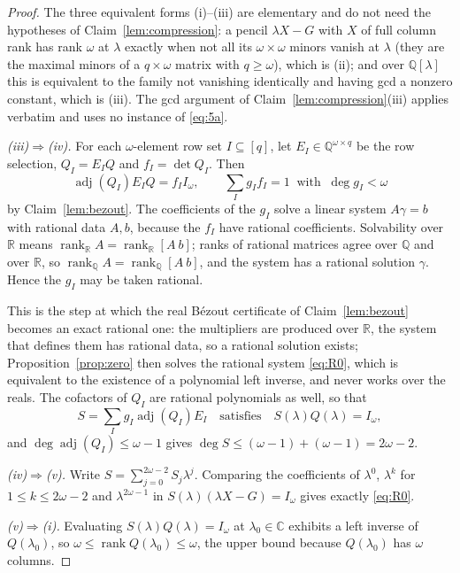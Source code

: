 \documentclass[journal]{IEEEtran}
\theoremstyle{plainn}
\theoremstyle{remark}
\begin{document}
\begin{proof}
The three equivalent forms (i)--(iii) are elementary and do not need the hypotheses of
Claim~\ref{lem:compression}: a pencil $\lambda X-G$ with $X$ of full column rank has rank $\omega$ at
$\lambda$ exactly when not all its $\omega\times\omega$ minors vanish at $\lambda$ (they are the maximal
minors of a $q\times\omega$ matrix with $q\ge\omega$), which is (ii); and over $\mathbb Q[\lambda]$ this
is equivalent to the family not vanishing identically and having gcd a nonzero constant, which is (iii).
The gcd argument of Claim~\ref{lem:compression}(iii) applies verbatim and uses no instance of
\eqref{eq:5a}.

\emph{(iii)$\Rightarrow$(iv).} For each $\omega$-element row set
$I\subseteq[q]$, let $E_I\in\mathbb Q^{\omega\times q}$ be the row selection,
$Q_I=E_IQ$ and $f_I=\det Q_I$. Then
\begin{equation*}
\operatorname{adj}(Q_I)E_IQ=f_II_\omega,\qquad
\sum_Ig_If_I=1\ \text{ with }\ \deg g_I<\omega
\end{equation*}
by Claim~\ref{lem:bezout}. The coefficients of the $g_I$ solve a linear system $A\gamma=b$ with rational data $A,b$, because the
$f_I$ have rational coefficients. Solvability over $\mathbb R$ means
$\operatorname{rank}_{\mathbb R}A=\operatorname{rank}_{\mathbb R}[A\ b]$; ranks of rational matrices
agree over $\mathbb Q$ and over $\mathbb R$, so
$\operatorname{rank}_{\mathbb Q}A=\operatorname{rank}_{\mathbb Q}[A\ b]$, and the system has a
rational solution $\gamma$. Hence the $g_I$ may be taken rational.

This is the step at which the real B\'ezout certificate of Claim~\ref{lem:bezout} becomes an exact
rational one: the multipliers are produced over $\mathbb R$, the system that defines them has rational
data, so a rational solution exists; Proposition~\ref{prop:zero} then solves the rational system
\eqref{eq:R0}, which is equivalent to the existence of a polynomial left inverse, and never works over
the reals. The cofactors of $Q_I$
are rational polynomials as well, so that
\begin{equation*}
S=\sum_Ig_I\operatorname{adj}(Q_I)E_I
\quad\text{satisfies}\quad
S(\lambda)Q(\lambda)=I_\omega ,
\end{equation*}
and $\deg\operatorname{adj}(Q_I)\le\omega-1$ gives
$\deg S\le(\omega-1)+(\omega-1)=2\omega-2$.

\emph{(iv)$\Rightarrow$(v).} Write $S=\sum_{j=0}^{2\omega-2}S_j\lambda^j$. Comparing the
coefficients of $\lambda^0$, $\lambda^k$ for $1\le k\le2\omega-2$ and $\lambda^{2\omega-1}$ in
$S(\lambda)(\lambda X-G)=I_\omega$ gives exactly \eqref{eq:R0}.

\emph{(v)$\Rightarrow$(i).} Evaluating $S(\lambda)Q(\lambda)=I_\omega$ at $\lambda_0\in\mathbb C$
exhibits a left inverse of $Q(\lambda_0)$, so $\omega\le\operatorname{rank}Q(\lambda_0)\le\omega$,
the upper bound because $Q(\lambda_0)$ has $\omega$ columns.
\end{proof}
\end{document}
